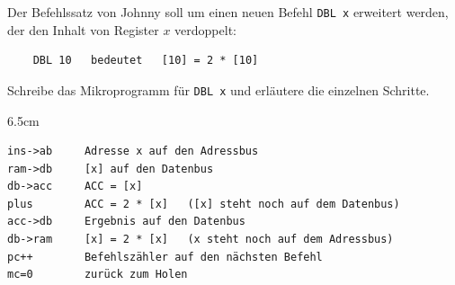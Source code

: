\question[4]
Der Befehlssatz von Johnny soll um einen neuen Befehl \texttt{DBL x} erweitert werden,
der den Inhalt von Register $x$ verdoppelt:
\begin{verbatim}
    DBL 10   bedeutet   [10] = 2 * [10]
\end{verbatim}
Schreibe das Mikroprogramm für \texttt{DBL x} und erläutere die einzelnen Schritte.

\begin{solutionbox}{6.5cm}
\begin{verbatim}
ins->ab     Adresse x auf den Adressbus
ram->db     [x] auf den Datenbus
db->acc     ACC = [x]
plus        ACC = 2 * [x]   ([x] steht noch auf dem Datenbus)
acc->db     Ergebnis auf den Datenbus
db->ram     [x] = 2 * [x]   (x steht noch auf dem Adressbus)
pc++        Befehlszähler auf den nächsten Befehl
mc=0        zurück zum Holen
\end{verbatim}
\end{solutionbox}
